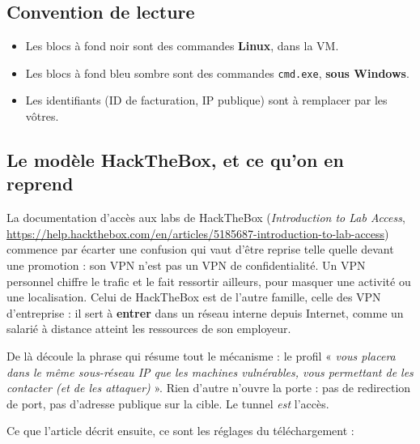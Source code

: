 \documentclass[a4paper,12pt]{article}
\begin{document}
\subsection{Convention de lecture}
\label{sec:convention}

\begin{itemize}
    \item Les blocs à fond noir sont des commandes \textbf{Linux}, dans la VM.
    \item Les blocs à fond bleu sombre sont des commandes \texttt{cmd.exe}, \textbf{sous Windows}.
    \item Les identifiants (ID de facturation, IP publique) sont à remplacer par les vôtres.
\end{itemize}

\subsection{Le modèle HackTheBox, et ce qu'on en reprend}
\label{sec:htb}

La documentation d'accès aux labs de HackTheBox (\emph{Introduction to Lab
Access}, \url{https://help.hackthebox.com/en/articles/5185687-introduction-to-lab-access}) commence par écarter une
confusion qui vaut d'être reprise telle quelle devant une promotion : son VPN
n'est pas un VPN de confidentialité. Un VPN personnel chiffre le trafic et le
fait ressortir ailleurs, pour masquer une activité ou une localisation. Celui
de HackTheBox est de l'autre famille, celle des VPN d'entreprise : il sert à
\textbf{entrer} dans un réseau interne depuis Internet, comme un salarié à
distance atteint les ressources de son employeur.

De là découle la phrase qui résume tout le mécanisme : le profil
« \emph{vous placera dans le même sous-réseau IP que les machines
vulnérables, vous permettant de les contacter (et de les attaquer)} ». Rien
d'autre n'ouvre la porte : pas de redirection de port, pas d'adresse publique
sur la cible. Le tunnel \emph{est} l'accès.

Ce que l'article décrit ensuite, ce sont les réglages du téléchargement :
\end{document}
